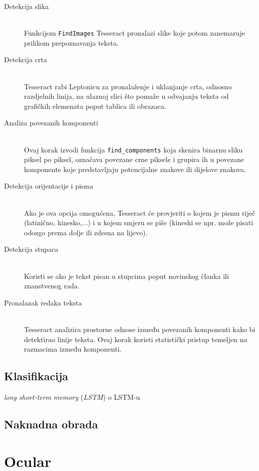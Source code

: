 \documentclass[zavrsnirad]{fer}
\begin{document}
\begin{description}
	\item[Detekcija slika] \hfill \\ Funkcijom \texttt{FindImages} Tesseract pronalazi slike koje potom zanemaruje prilikom prepoznavanja teksta.
	\item[Detekcija crta] \hfill \\ Tesseract rabi Leptonicu za pronalaženje i uklanjanje crta, odnosno razdjelnih linija, na ulaznoj slici što pomaže u odvajanju teksta od grafičkih elemenata poput tablica ili obrazaca.
	\item[Analiza povezanih komponenti] \hfill \\ Ovaj korak izvodi funkcija \texttt{find\_components} koja skenira binarnu sliku piksel po piksel, označava povezane crne piksele i grupira ih u povezane komponente koje predstavljaju potencijalne znakove ili dijelove znakova.
	\item[Detekcija orijentacije i pisma] \hfill \\ Ako je ova opcija omogućena, Tesseract će provjeriti o kojem je pismu riječ (latinično, kinesko,...) i u kojem smjeru se piše (kineski se npr. može pisati odozgo prema dolje ili zdesna na lijevo).
	\item[Detekcija stupaca] \hfill \\ Koristi se ako je tekst pisan u stupcima poput novinskog članka ili znanstvenog rada.
	\item[Pronalazak redaka teksta] \hfill \\ Tesseract analizira prostorne odnose između povezanih komponenti kako bi detektirao linije teksta. Ovaj korak koristi statistički pristup temeljen na razmacima između komponenti.
\end{description}

\section{Klasifikacija}

\textit{long short-term memory} (\textit{LSTM})
\cite{Breuel2013} o LSTM-u

\section{Naknadna obrada}





\chapter{Ocular}
\label{pog:ocular}
\end{document}
